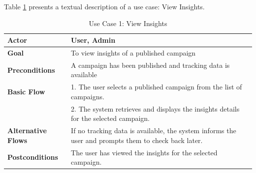 Table \ref{tab:Use Case 1 View Insights} presents a textual description of a use case: View Insights.

\clearpage

\begin{table}[ht]
	\centering
	\begin{tabularx}{\textwidth}{|l|X|}
		\hline
		\textbf{Actor}             & User, Admin                                                                                         \\
		\hline
		\textbf{Goal}              & To view insights of a published campaign                                                            \\
		\hline
		\textbf{Preconditions}     & A campaign has been published and tracking data is available                                        \\
		\hline
		\textbf{Basic Flow}        & 1. The user selects a published campaign from the list of campaigns.                                \\
		                           & 2. The system retrieves and displays the insights details for the selected campaign.                \\
		\hline
		\textbf{Alternative Flows} & If no tracking data is available, the system informs the user and prompts them to check back later. \\
		\hline
		\textbf{Postconditions}    & The user has viewed the insights for the selected campaign.                                         \\
		\hline
	\end{tabularx}
	\caption{Use Case 1: View Insights}
	\label{tab:Use Case 1 View Insights}
\end{table}